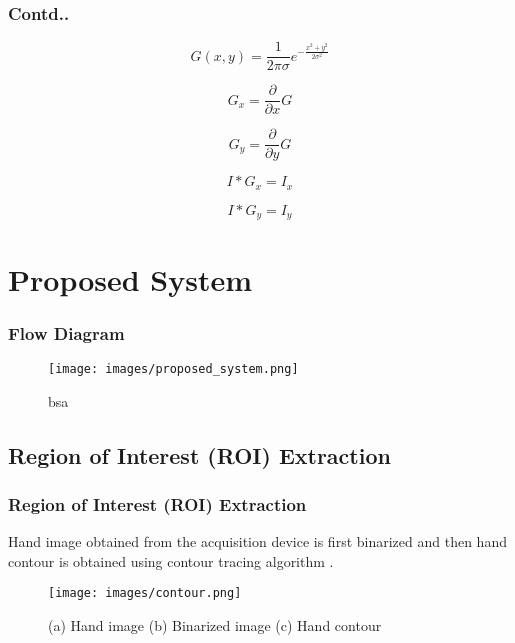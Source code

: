 \documentclass{beamer}
\begin{document}
\begin{frame}
 \frametitle{Contd..}
\begin{equation}
  G(x,y) = \frac{1}{2 \pi \sigma} e^{-\frac{x^2 + y^2}{2 \sigma^2}}
 \end{equation}

 \begin{equation}
  G_x = \frac{\partial}{\partial x} G
 \end{equation}

\begin{equation}
  G_y = \frac{\partial}{\partial y} G
 \end{equation}

\begin{equation}
  I * G_x = I_x
 \end{equation}

\begin{equation}
  I * G_y = I_y
 \end{equation}


\end{frame}


\section{Proposed System}
\begin{frame}
\frametitle{Flow Diagram}
	\begin{figure}
	\begin{center}
	\texttt{[image: images/proposed\_system.png]}
	\caption{bsa}
	\label{fig:bsa}
	\end{center}
	\end{figure}
\end{frame}



\subsection{Region of Interest (ROI) Extraction}
\begin{frame}
\frametitle{Region of Interest (ROI) Extraction}
Hand image obtained from the acquisition device is first binarized and then hand contour is obtained
using contour tracing algorithm \cite{nareshthesis}.
\begin{figure}
	\begin{center}
	\texttt{[image: images/contour.png]}
	\caption{(a) Hand image (b) Binarized image (c) Hand contour}
	\label{contour}
	\end{center}
	\end{figure}
\end{frame}
\end{document}
